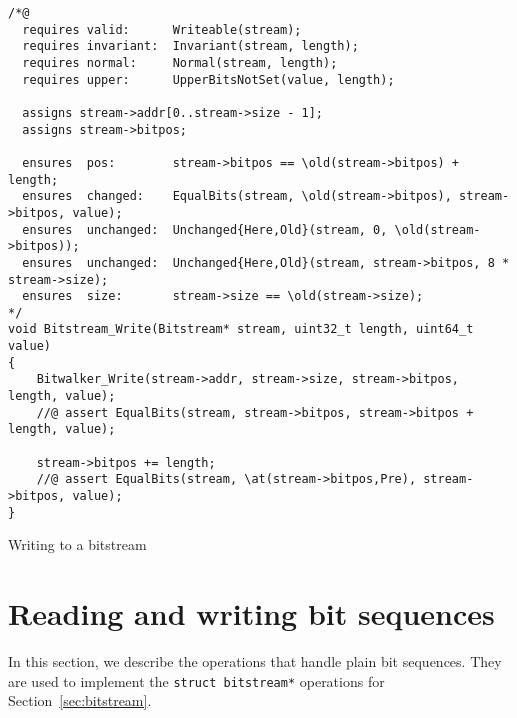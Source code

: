 \begin{listing}[hbt]
\begin{minipage}{0.99\textwidth}
\begin{lstlisting}[style=acsl-block]
/*@
  requires valid:      Writeable(stream);
  requires invariant:  Invariant(stream, length);
  requires normal:     Normal(stream, length);
  requires upper:      UpperBitsNotSet(value, length);

  assigns stream->addr[0..stream->size - 1];
  assigns stream->bitpos;

  ensures  pos:        stream->bitpos == \old(stream->bitpos) + length;
  ensures  changed:    EqualBits(stream, \old(stream->bitpos), stream->bitpos, value);
  ensures  unchanged:  Unchanged{Here,Old}(stream, 0, \old(stream->bitpos));
  ensures  unchanged:  Unchanged{Here,Old}(stream, stream->bitpos, 8 * stream->size);
  ensures  size:       stream->size == \old(stream->size);
*/
void Bitstream_Write(Bitstream* stream, uint32_t length, uint64_t value)
{
    Bitwalker_Write(stream->addr, stream->size, stream->bitpos, length, value);
    //@ assert EqualBits(stream, stream->bitpos, stream->bitpos + length, value);

    stream->bitpos += length;
    //@ assert EqualBits(stream, \at(stream->bitpos,Pre), stream->bitpos, value);
}

\end{lstlisting}
\end{minipage}
\caption{\label{lst:Bitstream_Write impl}Writing to a bitstream}
\end{listing}














\FloatBarrier

\section{Reading and writing bit sequences}
\label{sec:bit sequences}

In this section, we describe the operations that handle plain bit sequences.
%
They are used to implement the \lstinline{struct bitstream*} operations for
Section~\ref{sec:bitstream}.

